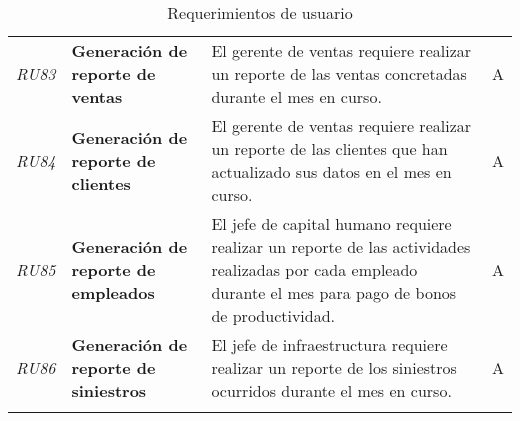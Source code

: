 \begin{longtable}[H]{m{2cm}m{3cm}m{5cm}m{2cm}}
\textit{RU83} & \textbf{Generación de reporte de ventas} & El gerente de ventas requiere realizar un reporte de las ventas concretadas durante el mes en curso. & A\tabularnewline
\textit{RU84} & \textbf{Generación de reporte de clientes} & El gerente de ventas requiere realizar un reporte de las clientes que han actualizado sus datos en el mes en curso. & A\tabularnewline
\textit{RU85} & \textbf{Generación de reporte de empleados} & El jefe de capital humano requiere realizar un reporte de las actividades realizadas por cada empleado durante el mes para pago de bonos de productividad. & A\tabularnewline
\textit{RU86} & \textbf{Generación de reporte de siniestros} & El jefe de infraestructura requiere realizar un reporte de los siniestros ocurridos durante el mes en curso. & A\tabularnewline
\caption{Requerimientos de usuario}
\label{tbl:listaRU}
\bottomrule
\end{longtable}

